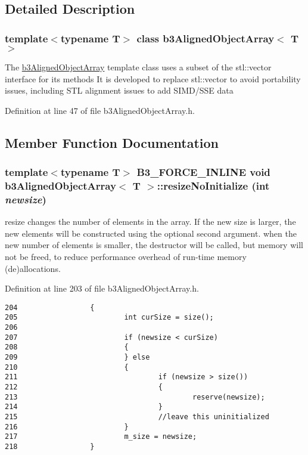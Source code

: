 \subsection{Detailed Description}
\subsubsection*{template$<$typename T$>$ class b3AlignedObjectArray$<$ T $>$}

The \hyperlink{classb3_aligned_object_array}{b3AlignedObjectArray} template class uses a subset of the stl::vector interface for its methods It is developed to replace stl::vector to avoid portability issues, including STL alignment issues to add SIMD/SSE data 

Definition at line 47 of file b3AlignedObjectArray.h.

\subsection{Member Function Documentation}
\hypertarget{classb3_aligned_object_array_5f21071bc7b73c1a0b4fcfde123e5182}{
\subsubsection[resizeNoInitialize]{\setlength{\rightskip}{0pt plus 5cm}template$<$typename T$>$ B3\_\-FORCE\_\-INLINE void {\bf b3AlignedObjectArray}$<$ T $>$::resizeNoInitialize (int {\em newsize})}}
\label{classb3_aligned_object_array_5f21071bc7b73c1a0b4fcfde123e5182}


resize changes the number of elements in the array. If the new size is larger, the new elements will be constructed using the optional second argument. when the new number of elements is smaller, the destructor will be called, but memory will not be freed, to reduce performance overhead of run-time memory (de)allocations. 

Definition at line 203 of file b3AlignedObjectArray.h.

\begin{Code}\begin{verbatim}204                 {
205                         int curSize = size();
206 
207                         if (newsize < curSize)
208                         {
209                         } else
210                         {
211                                 if (newsize > size())
212                                 {
213                                         reserve(newsize);
214                                 }
215                                 //leave this uninitialized
216                         }
217                         m_size = newsize;
218                 }
\end{verbatim}
\end{Code}




